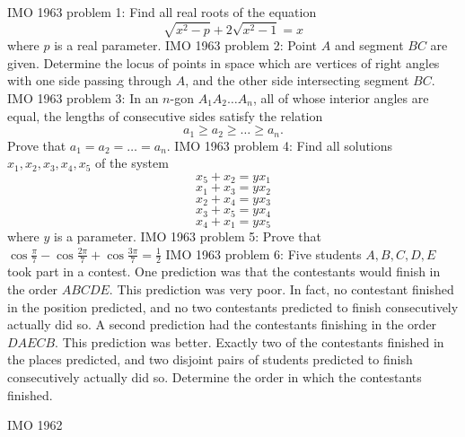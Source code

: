 IMO 1963 problem 1:  Find all real roots of the equation
\[ \sqrt{x^2-p}+2\sqrt{x^2-1}=x \]
where $p$ is a real parameter. 
IMO 1963 problem 2:  Point $A$ and segment $BC$ are given. Determine the locus of points in space which are vertices of right angles with one side passing through $A$, and the other side intersecting segment $BC$. 
IMO 1963 problem 3:  In an $n$-gon $A_1A_2\ldots A_n$, all of whose interior angles are equal, the lengths of consecutive sides satisfy the relation
\[ a_1\geq a_2\geq \dots \geq a_n. \]
Prove that $a_1=a_2= \ldots= a_n$. 
IMO 1963 problem 4:  Find all solutions $x_1, x_2, x_3, x_4, x_5$ of the system
\[ x_5+x_2=yx_1 \]
\[ x_1+x_3=yx_2 \]
\[ x_2+x_4=yx_3 \]
\[ x_3+x_5=yx_4 \]
\[ x_4+x_1=yx_5 \]
where $y$ is a parameter. 
IMO 1963 problem 5:  Prove that $\cos{\frac{\pi}{7}}-\cos{\frac{2\pi}{7}}+\cos{\frac{3\pi}{7}}=\frac{1}{2}$ 
IMO 1963 problem 6:  Five students $ A, B, C, D, E$ took part in a contest. One prediction was that the contestants would finish in the order $ ABCDE$. This prediction was very poor. In fact, no contestant finished in the position predicted, and no two contestants predicted to finish consecutively actually did so. A second prediction had the contestants finishing in the order $ DAECB$. This prediction was better. Exactly two of the contestants finished in the places predicted, and two disjoint pairs of students predicted to finish consecutively actually did so. Determine the order in which the contestants finished. 

IMO 1962 

